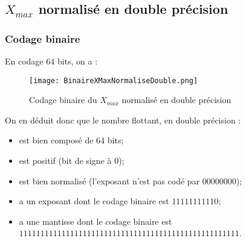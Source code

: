 \documentclass[a4paper, titlepage]{livret} %
\begin{document}
			\subsection{$X_{max}$ normalisé en double précision}
				\subsubsection{Codage binaire}
					En codage $64$ bits, on a :
					\begin{figure}[!h]
						\centering
  							\texttt{[image: BinaireXMaxNormaliseDouble.png]}
  							\caption{Codage binaire du $X_{max}$ normalisé en double précision}
					\end{figure}
	
					On en déduit donc que le nombre flottant, en double précision :
					\begin{itemize}
						\item est bien composé de $64$ bits;
						\item est positif (bit de signe à 0);
						\item est bien normalisé (l'exposant n'est pas codé par $00000000$);
						\item a un exposant dont le codage binaire est $11111111110$;
						\item a une mantisse dont le codage binaire est $11111111 11111111 11111111 11111111 11111111 11111111 1111$.
					\end{itemize}
\end{document}
